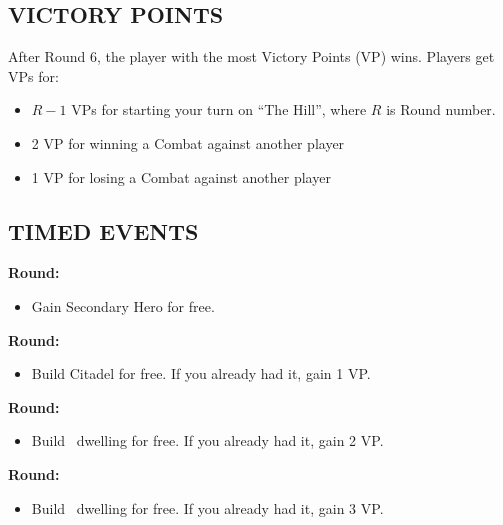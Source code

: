 \begin{multicols}{2}
\subsection*{\MakeUppercase{Victory Points}}
After Round 6, the player with the most Victory Points (VP) wins.
Players get VPs for:
\begin{itemize}
  \item $R-1$ VPs for starting your turn on ``The Hill'', where $R$ is Round number.
  \item 2 VP for winning a Combat against another player
  \item 1 VP for losing a Combat against another player
\end{itemize}

\subsection*{\MakeUppercase{Timed Events}}

\textbf{ Round:}
\begin{itemize}
  \item Gain Secondary Hero for free.
\end{itemize}
\textbf{ Round:}
\begin{itemize}
  \item Build Citadel for free. If you already had it, gain 1 VP.
\end{itemize}
\textbf{ Round:}
\begin{itemize}
  \item Build \silver\ dwelling for free. If you already had it, gain 2 VP.
\end{itemize}
\textbf{ Round:}
\begin{itemize}
  \item Build \golden\ dwelling for free. If you already had it, gain 3 VP.
\end{itemize}


\end{multicols}
